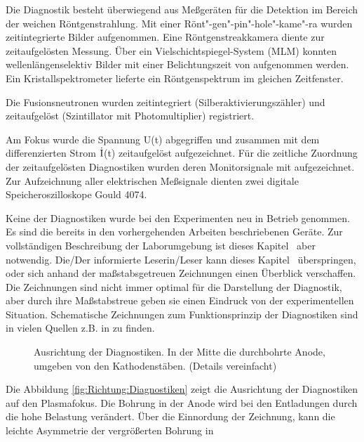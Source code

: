 %
%
\label{sec:diagnostiken}
%
Die Diagnostik besteht überwiegend aus Meßgeräten für die
Detektion im Bereich der weichen Röntgenstrahlung. Mit einer
Rönt"-gen"-pin"-hole"-kame"-ra wurden zeitintegrierte Bilder
aufgenommen. Eine Röntgenstreakkamera diente zur zeitaufgelösten
Messung. Über ein Vielschichtspiegel-System (MLM) konnten
wellenlängenselektiv Bilder mit einer Belichtungszeit von
 aufgenommen werden. Ein Kristallspektrometer
lieferte ein Röntgenspektrum im gleichen Zeitfenster.
\par
Die Fusionsneutronen wurden zeitintegriert (Silberaktivierungszähler) und
zeitaufgelöst (Szintillator mit Photomultiplier) registriert.
\par
Am Fokus wurde die Spannung U(t) abgegriffen und zusammen mit dem
differenzierten Strom $\dot{\rm I}$(t) zeitaufgelöst aufgezeichnet. Für
die zeitliche Zuordnung der zeitaufgelösten Diagnostiken wurden deren
Monitorsignale mit aufgezeichnet. Zur Aufzeichnung aller elektrischen
Meßsignale dienten zwei digitale Speicheroszilloskope Gould 4074.
\par
Keine der Diagnostiken wurde bei den Experimenten neu in Betrieb
genommen. Es sind die bereits in den vorhergehenden Arbeiten
\cite{maelzig:phd,roewe:phd} beschriebenen Geräte. Zur vollständigen
Beschreibung der Laborumgebung ist dieses Kapitel \thesection\ aber
notwendig. Die/Der informierte Leserin/Leser kann dieses Kapitel
\thesection\  überspringen, oder sich anhand der maßstabsgetreuen
Zeichnungen einen Überblick verschaffen. Die Zeichnungen sind nicht
immer optimal für die Darstellung der Diagnostik, aber durch ihre
Maßstabstreue geben sie einen Eindruck von der experimentellen
Situation. Schematische Zeichnungen zum Funktionsprinzip der
Diagnostiken sind in vielen Quellen z.B. in
\cite{roewe:phd,maelzig:phd} zu finden.
%
\par
\begin{figure}[H]
  \center
  \caption{Ausrichtung der Diagnostiken. In der Mitte die durchbohrte Anode,
  umgeben von den Kathodenstäben. (Details vereinfacht)}
  \label{fig:Richtung:Diagnostiken}
\end{figure}
%
\par
Die Abbildung \vref{fig:Richtung:Diagnostiken} zeigt die Ausrichtung
der Diagnostiken auf den Plasmafokus. Die Bohrung in der Anode wird bei
den Entladungen durch die hohe Belastung verändert. Über die Einnordung
der Zeichnung, kann die leichte Asymmetrie der vergrößerten Bohrung in
